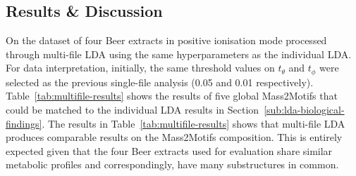 \subsection{Results \& Discussion}

On the dataset of four Beer extracts in positive ionisation mode processed through multi-file LDA using the same hyperparameters as the individual LDA. For data interpretation, initially, the same threshold values on $t_{\theta}$ and $t_{\phi}$ were selected as the previous single-file analysis (0.05 and 0.01 respectively). Table~\ref{tab:multifile-results} shows the results of five global Mass2Motifs that could be matched to the individual LDA results in Section~\ref{sub:lda-biological-findings}. The results in Table~\ref{tab:multifile-results} shows that multi-file LDA produces comparable results on the Mass2Motifs composition. This is entirely expected given that the four Beer extracts used for evaluation share similar metabolic profiles and correspondingly, have many substructures in common. 

